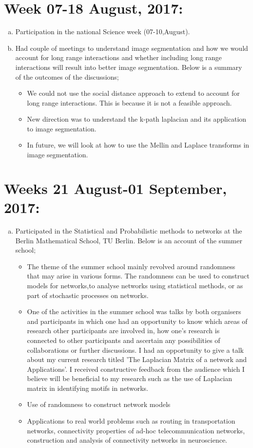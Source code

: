 \documentclass[10pt,a4paper]{article}
\begin{document}
\section*{Week 07-18 August, 2017:}
\begin{enumerate}[a)]
	\item Participation in the national Science week (07-10,August).
	\item Had couple of meetings to understand image segmentation and how we would account for long range interactions and whether including long range interactions will result into better image segmentation.  Below is a summary of the outcomes of the discussions;
	\begin{itemize}
		\item We could not use the social distance approach to extend to account for long range interactions. This is because it is not a feasible approach.
		\item New direction was to understand the k-path laplacian and its application to image segmentation.
		\item In future, we will look at how to use the Mellin and Laplace transforms in image segmentation.                                
	\end{itemize}
\end{enumerate}

\section*{Weeks 21 August-01 September, 2017:}
\begin{enumerate}[a)]
	\item Participated in the Statistical and Probabilistic methods to networks at the Berlin Mathematical School, TU Berlin. Below is an account of the summer school;
	\begin{itemize}
		\item The theme of the summer school mainly revolved around randomness that may arise in various forms. The randomness can be used to construct models for networks,to analyse networks using statistical methods, or as part of stochastic processes on networks. 
		\item One of the activities in the summer school was talks by both organisers and participants in which one had an opportunity to know which areas of research other participants are involved in, how one's research is connected to other participants and ascertain any possibilities of collaborations or further discussions. I had an opportunity to give a talk about my current research titled 'The Laplacian Matrix of a network and Applications'.  I received constructive feedback from the audience which I believe will be beneficial to my research such as the use of Laplacian matrix in identifying motifs in networks.
		\item Use of randomness to construct network models
		\item Applications to real world problems such as routing in transportation networks,  connectivity properties of ad-hoc telecommunication networks, construction and analysis of connectivity networks in neuroscience.    
	\end{itemize}
\end{enumerate}
\end{document}
